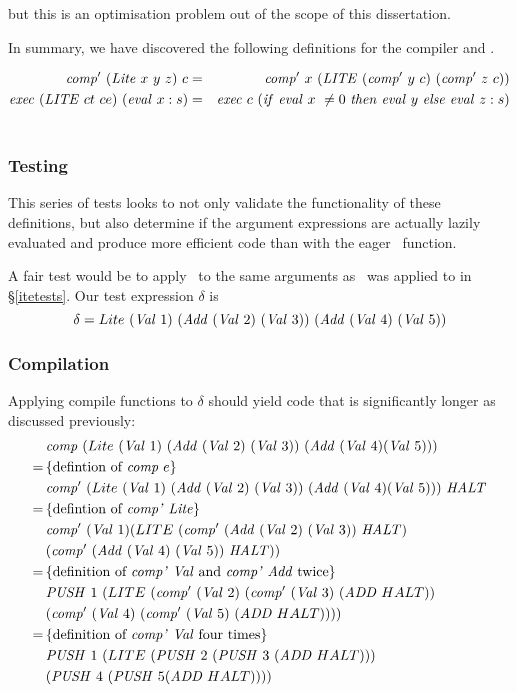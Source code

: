 \documentclass {article}
\begin{document}
\noindent but this is an optimisation problem 
out of the scope of this dissertation.

In summary, we have discovered the following 
definitions for the compiler and \vm.

\begin{eqnarray}
\Compp  (\Lite x\ y\ z)\ c 
	&=& \Compp  x\ (\LITE (\Compp  y\ c)\ (\Compp  z\ c)) \label{complite} \\
\Exec (\LITE ct\ ce)\ (\evalf  x:s) 
	&=& \Exec c\ (\ifff \evalf  x\ \not= 0\ \tthen \evalf  y\ \eelse \evalf  z : s) \nonumber \\
	& \label{execlite}
\end{eqnarray}

\subsubsection{Testing}

This series of tests looks to not only
validate the functionality of these
definitions, but also determine
if the argument expressions are actually lazily evaluated
and produce more efficient code than with the eager
\ite\ function.

A fair test would be to apply \lite\ to 
the same arguments as \ite\ was applied to 
in \S\ref{itetests}. 
Our test expression $\delta$ is
\[ \delta = Lite\ (\Val 1)\
		 (\Add (\Val 2)\ (\Val 3))\ 
		(\Add (\Val 4)\ (\Val 5)) \]

\subsubsection{Compilation}

Applying compile functions to $\delta$ should
yield code that is significantly longer as
discussed previously:
\begin{align*}	
&\Comp (Lite\ (\Val 1)\ (\Add (\Val 2)\ (\Val 3))\ 
						(\Add (\Val 4) (\Val 5))) \\
=\, & \{ \mbox{defintion of \comp\ $e$} \} \\
&\Compp (Lite\ (\Val 1)\ (\Add (\Val 2)\ (\Val 3))\ 
						(\Add (\Val 4) (\Val 5)))\ \HALT \\
=\, & \{ \mbox{defintion of \compp\ \lite} \} \\
&\Compp  (\Val 1) (LITE\ (\Compp (\Add (\Val 2)\ (\Val 3))\ \HALT)\\ 
							&(\Compp (\Add (\Val 4)\ (\Val 5))\ \HALT)) \\
=\, & \{ \mbox{definition of \compp\ \val\ and \compp\ \add\ twice}\} \\
&\PUSH 1\ (LITE\ (\Compp  (\Val 2)\ (\Compp  (\Val 3)\ (\ADD  HALT)) \\
				&(\Compp   (\Val 4)\ (\Compp  (\Val 5)\ (\ADD  HALT)))) \\
=\, & \{ \mbox{definition of \compp\ \val\ four times} \} \\
&\PUSH 1\ (LITE\ (\PUSH 2\ (\PUSH 3\ (\ADD  HALT))) \\
			&(\PUSH 4\ (\PUSH 5 (\ADD  HALT))))
\end{align*}
\end{document}

